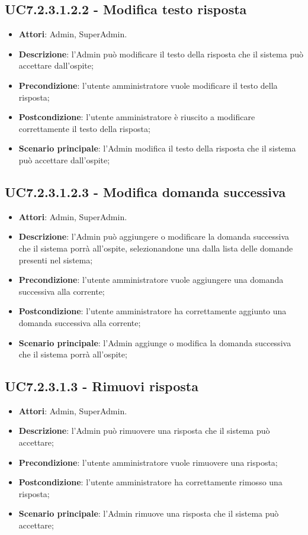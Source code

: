 \documentclass[../AnalisiDeiRequisiti_v3.0.0.tex]{subfiles}
\begin{document}
\subsection{UC7.2.3.1.2.2 - Modifica testo risposta} 
\label{sssec:UC7.2.3.1.2.2} 
\begin{itemize} 
\item \textbf{Attori}: Admin, SuperAdmin.
\item \textbf{Descrizione}: l'Admin può modificare il testo della risposta che il sistema può accettare dall'ospite;
\item \textbf{Precondizione}: l'utente amministratore vuole modificare il testo della risposta;
\item \textbf{Postcondizione}: l'utente amministratore è riuscito a modificare correttamente il testo della risposta;
\item \textbf{Scenario principale}: l'Admin modifica il testo della risposta che il sistema può accettare dall'ospite;
\end{itemize} 
\subsection{UC7.2.3.1.2.3 - Modifica domanda successiva} 
\label{sssec:UC7.2.3.1.2.3} 
\begin{itemize} 
\item \textbf{Attori}: Admin, SuperAdmin.
\item \textbf{Descrizione}: l'Admin può aggiungere o modificare la domanda successiva che il sistema porrà all'ospite, selezionandone una dalla lista delle domande presenti nel sistema;
\item \textbf{Precondizione}: l'utente amministratore vuole aggiungere una domanda successiva alla corrente;
\item \textbf{Postcondizione}: l'utente amministratore ha correttamente aggiunto una domanda successiva alla corrente;
\item \textbf{Scenario principale}: l'Admin aggiunge o modifica la domanda successiva che il sistema porrà all'ospite;
\end{itemize} 
\subsection{UC7.2.3.1.3 - Rimuovi risposta} 
\label{sssec:UC7.2.3.1.3} 
\begin{itemize} 
\item \textbf{Attori}: Admin, SuperAdmin.
\item \textbf{Descrizione}: l'Admin può rimuovere una risposta che il sistema può accettare;
\item \textbf{Precondizione}: l'utente amministratore vuole rimuovere una risposta;
\item \textbf{Postcondizione}: l'utente amministratore ha correttamente rimosso una risposta;
\item \textbf{Scenario principale}: l'Admin rimuove una risposta che il sistema può accettare;
\end{itemize}
\end{document}
